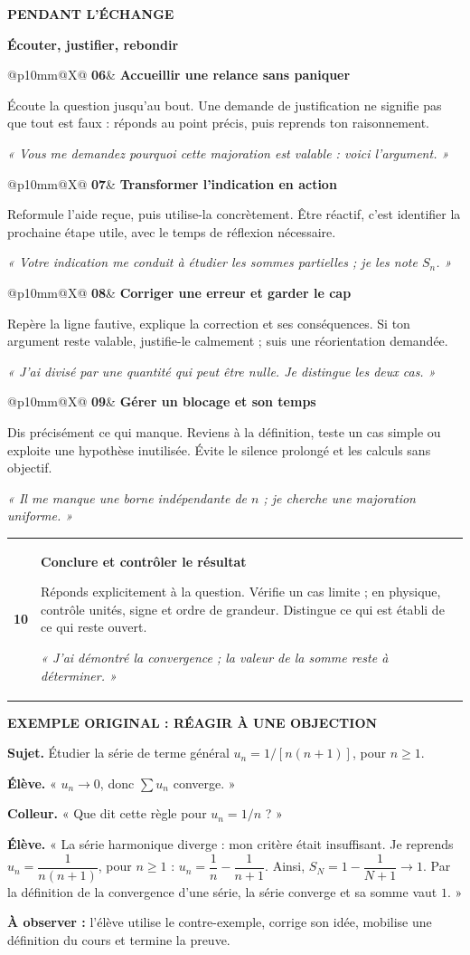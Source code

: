 \documentclass[11pt,a4paper]{article}
\makeatletter
\newcommand{\repere}[4]{%
  \begin{minipage}{\linewidth}
  \begin{tabularx}{\linewidth}{@{}p{10mm}@{\hspace{3mm}}X@{}}
  {\sffamily\bfseries\fontsize{20}{22}\selectfont\color{teal}#1}&
  {\sffamily\bfseries\large\color{ink}#2}\par\vspace{2mm}
  #3\par\vspace{1mm}
  {\small\color{teal}\textit{#4}}
  \end{tabularx}
  \end{minipage}\par\vspace{4.3mm}}
\newcommand{\bandeau}[2]{%
  \begingroup\setlength{\fboxsep}{4mm}%
  \colorbox{wash}{\parbox{\dimexpr\linewidth-8mm\relax}{%
  {\sffamily\bfseries\color{ink}#1}\par\vspace{2mm}#2}}%
  \endgroup}
\makeatother
\begin{document}
\newpage
{\sffamily\bfseries\small\color{teal}PENDANT L'ÉCHANGE}\par
\vspace{3mm}
{\sffamily\bfseries\fontsize{23}{26}\selectfont Écouter, justifier, rebondir}\par
\vspace{4.5mm}

\repere{06}{Accueillir une relance sans paniquer}
{Écoute la question jusqu'au bout. Une demande de justification ne signifie pas que tout est faux : réponds au point précis, puis reprends ton raisonnement.}
{« Vous me demandez pourquoi cette majoration est valable : voici l'argument. »}

\repere{07}{Transformer l'indication en action}
{Reformule l'aide reçue, puis utilise-la concrètement. Être réactif, c'est identifier la prochaine étape utile, avec le temps de réflexion nécessaire.}
{« Votre indication me conduit à étudier les sommes partielles ; je les note $S_n$. »}

\repere{08}{Corriger une erreur et garder le cap}
{Repère la ligne fautive, explique la correction et ses conséquences. Si ton argument reste valable, justifie-le calmement ; suis une réorientation demandée.}
{« J'ai divisé par une quantité qui peut être nulle. Je distingue les deux cas. »}

\repere{09}{Gérer un blocage et son temps}
{Dis précisément ce qui manque. Reviens à la définition, teste un cas simple ou exploite une hypothèse inutilisée. Évite le silence prolongé et les calculs sans objectif.}
{« Il me manque une borne indépendante de $n$ ; je cherche une majoration uniforme. »}

\repere{10}{Conclure et contrôler le résultat}
{Réponds explicitement à la question. Vérifie un cas limite ; en physique, contrôle unités, signe et ordre de grandeur. Distingue ce qui est établi de ce qui reste ouvert.}
{« J'ai démontré la convergence ; la valeur de la somme reste à déterminer. »}

\bandeau{EXEMPLE ORIGINAL : RÉAGIR À UNE OBJECTION}{%
\small
\textbf{Sujet.} Étudier la série de terme général $u_n=1/[n(n+1)]$, pour $n\geq1$.\par
\textbf{Élève.} « $u_n\to 0$, donc $\sum u_n$ converge. »\par
\textbf{Colleur.} « Que dit cette règle pour $u_n=1/n$ ? »\par
\textbf{Élève.} « La série harmonique diverge : mon critère était insuffisant.
Je reprends $u_n=\dfrac{1}{n(n+1)}$, pour $n\geq1$ :
$u_n=\dfrac1n-\dfrac1{n+1}$. Ainsi,
$S_N=1-\dfrac1{N+1}\to1$. Par la définition de la convergence d'une série,
la série converge et sa somme vaut $1$. »\par\vspace{1mm}
\textbf{À observer :} l'élève utilise le contre-exemple, corrige son idée,
mobilise une définition du cours et termine la preuve.}
\end{document}

